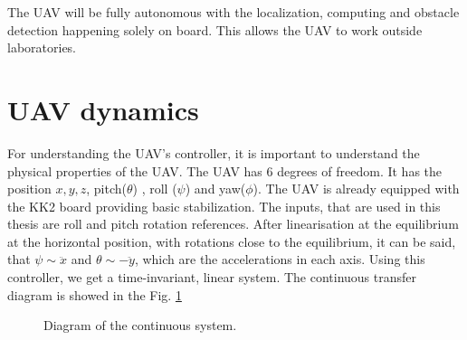 \documentclass[a4paper,11pt,titlepage]{article}
\begin{document}
The UAV will be fully autonomous with the localization, computing and obstacle detection happening solely on board. This allows the UAV to work outside laboratories.

\section{UAV dynamics}
For understanding the UAV's controller, it is important to understand the physical properties of the UAV. The UAV has 6 degrees of freedom. It has the position $x, y, z$, pitch($\theta$) , roll ($\psi$) and yaw($\phi$). The UAV is already equipped with the KK2 board providing basic stabilization. The inputs, that are used in this thesis are roll and pitch rotation references. After linearisation at the equilibrium at the horizontal position, with rotations close to the equilibrium, it can be said, that $\psi \sim \ddot{x}$ and $\theta \sim -\ddot{y}$, which are the accelerations in each axis. Using this controller, we get a time-invariant, linear system. The continuous transfer diagram is showed in the Fig. \ref{fig:LTI}

\begin{figure}[h]
\centering
{}
\caption{Diagram of the continuous system.}
\label{fig:LTI}
\end{figure}
\end{document}
